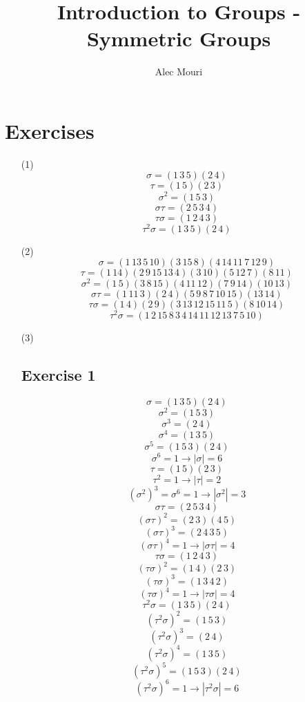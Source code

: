 \documentclass[12pt]{article}
\begin{document}
\title{Introduction to Groups - Symmetric Groups}
\author{Alec Mouri}

\maketitle
\section*{Exercises}
\begin{itemize}
\item[(1)]
$$\sigma = (1 \, 3 \, 5)(2 \, 4)$$
$$\tau = (1 \, 5)(2 \, 3)$$
$$\sigma^2 = (1 \, 5 \, 3)$$
$$\sigma\tau = (2 \, 5 \, 3 \, 4)$$
$$\tau\sigma = (1 \, 2 \, 4 \, 3)$$
$$\tau^2\sigma = (1 \, 3 \, 5)(2 \, 4)$$
\item[(2)]
$$\sigma = (1 \, 13 \, 5 \, 10)(3 \, 15 \, 8)(4 \, 14 \, 11 \, 7 \, 12 \, 9)$$
$$\tau = (1 \, 14)(2 \, 9 \, 15 \, 13 \, 4)(3 \, 10)(5 \, 12 \, 7)(8 \, 11)$$
$$\sigma^2 = (1 \, 5)(3 \, 8 \, 15)(4 \, 11 \, 12)(7 \, 9 \, 14)(10 \, 13)$$
$$\sigma\tau = (1 \, 11 \, 3)(2 \, 4)(5 \, 9 \, 8 \, 7 \, 10 \, 15)(13 \, 14)$$
$$\tau\sigma = (1 \, 4)(2 \, 9)(3 \, 13 \, 12 \, 15 \, 11 \, 5)(8 \, 10 \, 14)$$
$$\tau^2\sigma = (1 \, 2 \, 15 \, 8 \, 3 \, 4 \, 14 \, 11 \, 12 \, 13 \, 7 \, 5 \, 10)$$
\item[(3)]
\subsection*{Exercise 1}
$$\sigma = (1 \, 3 \, 5)(2 \, 4)$$
$$\sigma^2 = (1 \, 5 \, 3)$$
$$\sigma^3 = (2 \, 4)$$
$$\sigma^4 = (1 \, 3 \, 5)$$
$$\sigma^5 = (1 \, 5 \, 3)(2 \, 4)$$
$$\sigma^6 = 1 \rightarrow |\sigma| = 6$$
$$\tau = (1 \, 5)(2 \, 3)$$
$$\tau^2 = 1 \rightarrow |\tau| = 2$$
$$(\sigma^2)^3 = \sigma^6 = 1 \rightarrow |\sigma^2| = 3$$
$$\sigma\tau = (2 \, 5 \, 3 \, 4)$$
$$(\sigma\tau)^2 = (2 \, 3)(4 \, 5)$$
$$(\sigma\tau)^3 = (2 \, 4 \, 3 \, 5)$$
$$(\sigma\tau)^4 = 1 \rightarrow |\sigma\tau| = 4$$
$$\tau\sigma = (1 \, 2 \, 4 \, 3)$$
$$(\tau\sigma)^2 = (1 \, 4)(2 \, 3)$$
$$(\tau\sigma)^3 = (1 \, 3 \, 4 \, 2)$$
$$(\tau\sigma)^4 = 1 \rightarrow |\tau\sigma| = 4$$
$$\tau^2\sigma = (1 \, 3 \, 5)(2 \, 4)$$
$$(\tau^2\sigma)^2 = (1 \, 5 \, 3)$$
$$(\tau^2\sigma)^3 = (2 \, 4)$$
$$(\tau^2\sigma)^4 = (1 \, 3 \, 5)$$
$$(\tau^2\sigma)^5 = (1 \, 5 \, 3)(2 \, 4)$$
$$(\tau^2\sigma)^6 = 1 \rightarrow |\tau^2\sigma| = 6$$

\end{itemize}
\end{document}
